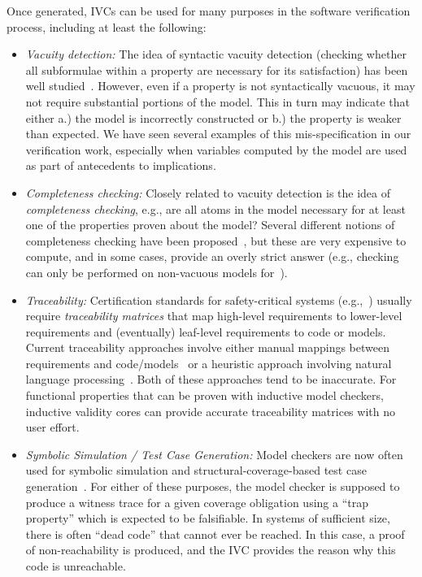 Once generated, IVCs can be used for many purposes in the software verification process, including at least the following:

\begin{itemize}
\item \emph{Vacuity detection:} The idea of syntactic vacuity detection (checking whether all subformulae within a property are necessary for its satisfaction) has been well studied~\cite{Kupferman03:Vacuity}.   However, even if a property is not syntactically vacuous, it may not require substantial portions of the model.  This in turn may indicate that either a.) the model is incorrectly constructed or b.) the property is weaker than expected.  We have seen several examples of this mis-specification in our verification work, especially when variables computed by the model are used as part of antecedents to implications.

\item \emph{Completeness checking:} Closely related to vacuity detection is the idea of {\em completeness checking}, e.g., are all atoms in the model necessary for at least one of the properties proven about the model?  Several different notions of completeness checking have been proposed~\cite{chockler_coverage_2003, kupferman_theory_2008}, but these are very expensive to compute, and in some cases, provide an overly strict answer (e.g., checking can only be performed on non-vacuous models for~\cite{kupferman_theory_2008}).

\item \emph{Traceability:} Certification standards for safety-critical systems (e.g.,~\cite{DO178C, MOD:00-55}) usually require {\em traceability matrices} that map high-level requirements to lower-level requirements and (eventually) leaf-level requirements to code or models.  Current traceability approaches involve either manual mappings between requirements and code/models~\cite{SimulinkTraceability} or a heuristic approach involving natural language processing~\cite{Keenan12:Tracelab}.  Both of these approaches tend to be inaccurate.  For functional properties that can be proven with inductive model checkers, inductive validity cores can provide accurate traceability matrices with no user effort.

\item \emph{Symbolic Simulation / Test Case Generation:} Model checkers are now often used for symbolic simulation and structural-coverage-based test case generation~\cite{SimulinkDesignVerifier,Whalen13:OMCDC}.  For either of these purposes, the model checker is supposed to produce a witness trace for a given coverage obligation using a ``trap property'' which is expected to be falsifiable.  In systems of sufficient size, there is often ``dead code'' that cannot ever be reached.  In this case, a proof of non-reachability is produced, and the IVC provides the reason why this code is unreachable.
\end{itemize}


